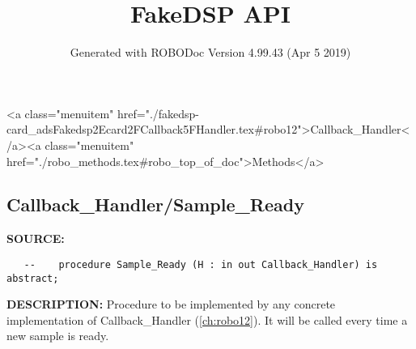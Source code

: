 \documentclass{article}
\title{FakeDSP API}
\author{Generated with ROBODoc Version 4.99.43 (Apr  5 2019)
}
\begin{document}
\maketitle
\printindex
\tableofcontents
\newpage

<a class="menuitem" href="./fakedsp-card_adsFakedsp2Ecard2FCallback5FHandler.tex#robo12">Callback_Handler</a><a class="menuitem" href="./robo_methods.tex#robo_top_of_doc">Methods</a>\subsection{Callback\_Handler/Sample\_Ready}
\textbf{SOURCE:}\hspace{0.08in}\begin{verbatim}
   --    procedure Sample_Ready (H : in out Callback_Handler) is abstract;
\end{verbatim}
\textbf{DESCRIPTION:}\hspace{0.08in}
   Procedure to be implemented by any concrete implementation of 
   Callback\_Handler (\ref{ch:robo12}). It will be called every time a new sample
   is ready.
\end{document}

